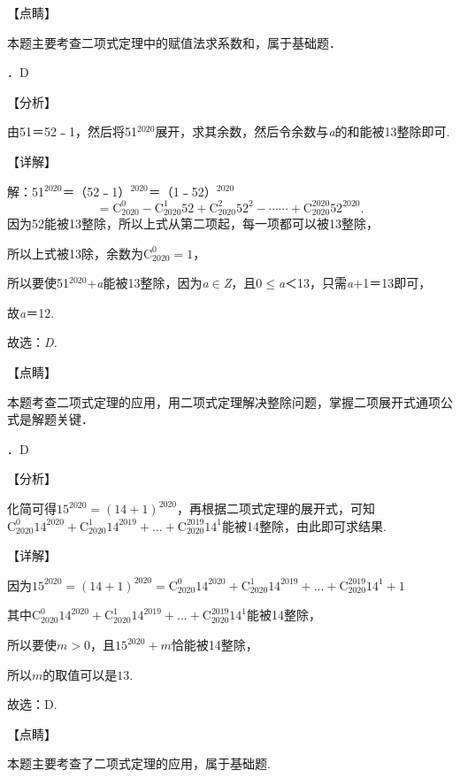 \noindent 【点睛】

\noindent 本题主要考查二项式定理中的赋值法求系数和，属于基础题．

．D

\noindent 【分析】

\noindent 由51＝52﹣1，然后将51${}^{2020}$展开，求其余数，然后令余数与\textit{a}的和能被13整除即可.

\noindent 【详解】

\noindent 解：51${}^{2020}$＝（52﹣1）${}^{2020}$＝（1﹣52）${}^{2020}$
\[=\mathrm C_{2020}^{0} -\mathrm C_{2020}^{1} 52+\mathrm C_{2020}^{2} 52^{2} -\cdots \cdots +\mathrm C_{2020}^{2020} 52^{2020} .\] 
因为52能被13整除，所以上式从第二项起，每一项都可以被13整除，

\noindent 所以上式被13除，余数为$\mathrm C_{2020}^{0} =1$，

\noindent 所以要使51${}^{2020}$+\textit{a}能被13整除，因为\textit{a}$\mathrm{\in}$\textit{Z}，且0$\mathrm{\le}$\textit{a}＜13，只需\textit{a}+1＝13即可，

\noindent 故\textit{a}＝12.

\noindent 故选：\textit{D.}

\noindent 【点睛】

\noindent 本题考查二项式定理的应用，用二项式定理解决整除问题，掌握二项展开式通项公式是解题关键．

．D

\noindent 【分析】

\noindent 化简可得$15^{2020} =\left(14+1\right)^{2020} $，再根据二项式定理的展开式，可知$\mathrm C_{2020}^{0} 14^{2020} +\mathrm C_{2020}^{1} 14^{2019} +...+\mathrm C_{2020}^{2019} 14^{1} $能被14整除，由此即可求结果.

\noindent 【详解】

\noindent 因为$15^{2020} =\left(14+1\right)^{2020} =\mathrm C_{2020}^{0} 14^{2020} +\mathrm C_{2020}^{1} 14^{2019} +...+\mathrm C_{2020}^{2019} 14^{1} +1$ 

\noindent 其中$\mathrm C_{2020}^{0} 14^{2020} +\mathrm C_{2020}^{1} 14^{2019} +...+\mathrm C_{2020}^{2019} 14^{1} $能被14整除，

\noindent 所以要使$m>0$，且$15^{2020} +m$恰能被14整除，

\noindent 所以$m$的取值可以是$13$.

\noindent 故选：D.

\noindent 【点睛】

\noindent 本题主要考查了二项式定理的应用，属于基础题.

